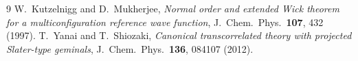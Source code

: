 \documentclass[11pt]{article}
\begin{document}
\begin{thebibliography}{9}
 W.~Kutzelnigg and D.~Mukherjee,
  \emph{Normal order and extended Wick theorem for a multiconfiguration
  reference wave function}, J.~Chem.~Phys.\ \textbf{107}, 432 (1997).
 T.~Yanai and T.~Shiozaki,
  \emph{Canonical transcorrelated theory with projected Slater-type geminals},
  J.~Chem.~Phys.\ \textbf{136}, 084107 (2012).
\end{thebibliography}
\end{document}
